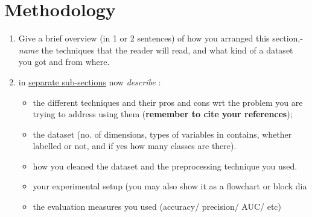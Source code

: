 \section{Methodology}
\begin{enumerate}
 \item Give a brief overview (in 1 or 2 sentences) of how you arranged this section,- \textit{name} the techniques that the reader will read, and what kind of a dataset you got and from where.
 \item in \underline{separate sub-sections} now \textit{describe} :
 \begin{itemize}
  \item the different techniques and their pros and cons wrt the problem you are trying to address using them (\textbf{remember to cite your references});
  \item the dataset (no. of dimensions, types of variables in contains, whether labelled or not, and if yes how many classes are there).
  \item how you cleaned the dataset and the preprocessing technique you used.
  \item your experimental setup (you may also show it as a flowchart or block dia
  \item the evaluation measures you used (accuracy/ precision/ AUC/ etc)
 \end{itemize}

\end{enumerate}